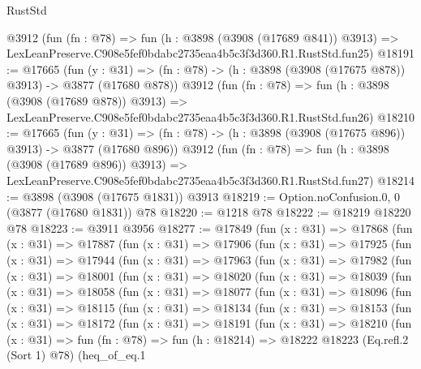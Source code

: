 \begin{lexlean}{RustStd}
\begin{coremodule}
    @3912
    (fun (fn : @78) =>
    fun (h : @3898 (@3908 (@17689 @841)) @3913) =>
    LexLeanPreserve.C908e5fef0bdabc2735eaa4b5c3f3d360.R1.RustStd.fun25)
@18191 := @17665
    (fun (y : @31) => (fn : @78) -> (h : @3898 (@3908 (@17675 @878)) @3913) -> @3877 (@17680 @878))
    @3912
    (fun (fn : @78) =>
    fun (h : @3898 (@3908 (@17689 @878)) @3913) =>
    LexLeanPreserve.C908e5fef0bdabc2735eaa4b5c3f3d360.R1.RustStd.fun26)
@18210 := @17665
    (fun (y : @31) => (fn : @78) -> (h : @3898 (@3908 (@17675 @896)) @3913) -> @3877 (@17680 @896))
    @3912
    (fun (fn : @78) =>
    fun (h : @3898 (@3908 (@17689 @896)) @3913) =>
    LexLeanPreserve.C908e5fef0bdabc2735eaa4b5c3f3d360.R1.RustStd.fun27)
@18214 := @3898 (@3908 (@17675 @1831)) @3913
@18219 := Option.noConfusion.{0, 0} (@3877 (@17680 @1831)) @78
@18220 := @1218 @78
@18222 := @18219 @18220 @78
@18223 := @3911 @3956
@18277 := @17849
    (fun (x : @31) =>
    @17868
      (fun (x : @31) =>
      @17887
        (fun (x : @31) =>
        @17906
          (fun (x : @31) =>
          @17925
            (fun (x : @31) =>
            @17944
              (fun (x : @31) =>
              @17963
                (fun (x : @31) =>
                @17982
                  (fun (x : @31) =>
                  @18001
                    (fun (x : @31) =>
                    @18020
                      (fun (x : @31) =>
                      @18039
                        (fun (x : @31) =>
                        @18058
                          (fun (x : @31) =>
                          @18077
                            (fun (x : @31) =>
                            @18096
                              (fun (x : @31) =>
                              @18115
                                (fun (x : @31) =>
                                @18134
                                  (fun (x : @31) =>
                                  @18153
                                    (fun (x : @31) =>
                                    @18172
                                      (fun (x : @31) =>
                                      @18191
                                        (fun (x : @31) =>
                                        @18210
                                          (fun (x : @31) =>
                                          fun (fn : @78) =>
                                          fun (h : @18214) =>
                                          @18222
                                            @18223
                                            (Eq.refl.{2} (Sort 1) @78)
                                            (heq_of_eq.{1}

\end{coremodule}
\end{lexlean}
